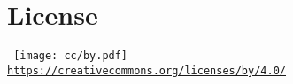 
\thispagestyle{empty} %
\flushbottom %
\maketitle %



\section*{License}

    \scriptsize\noindent%
    \begin{minipage}{\columnwidth}
        \centering\tt
        \texttt{[image: cc/by.pdf]}\\[0.5\smallskipamount]
        {\scriptsize\url{https://creativecommons.org/licenses/by/4.0/}}
    \end{minipage}
    \normalsize




